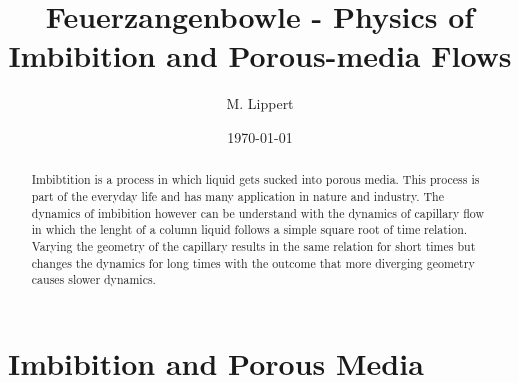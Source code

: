 \documentclass[aip, amsmath, amssymb, reprint, twocolumn, floatfix]{revtex4-1}
\begin{document}

\title[Feuerzangenbowle - Physics of Imbibition and Porous-media Flows]
{Feuerzangenbowle - Physics of Imbibition and Porous-media Flows}

\author{M. Lippert}

\date{\today}


\begin{abstract}
    Imbibtition is a process in which liquid gets sucked into porous media. This process is part of the everyday life and has many application in nature and industry. The dynamics of imbibition however can be understand with the dynamics of capillary flow in which the lenght of a column liquid follows a simple square root of time relation. Varying the geometry of the capillary results in the same relation for short times but changes the dynamics for long times with the outcome that more diverging geometry causes slower dynamics.
\end{abstract}

\maketitle


\section{Imbibition and Porous Media}
\label{sec:introdction}

\begin{center}
	\captionsetup{type=figure}
	
	\label{fig:porous-cube}
\end{center}
\end{document}
